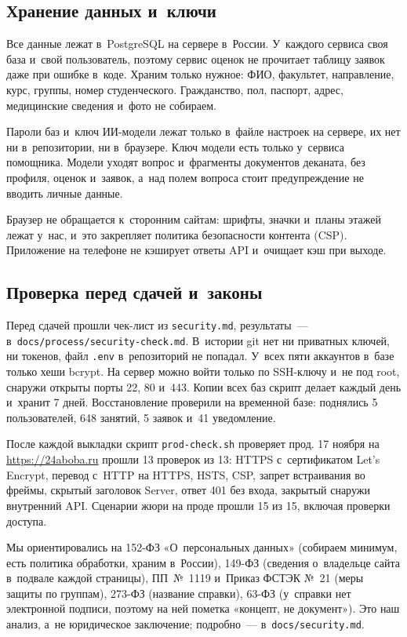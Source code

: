 \documentclass[a4paper,10pt]{article}
\let\oldsubsection\subsection
\renewcommand{\subsection}{\Needspace{10\baselineskip}\oldsubsection}
\newcommand{\code}[1]{\texttt{#1}}
\begin{document}
\subsection{Хранение данных и~ключи}

Все данные лежат в~PostgreSQL на сервере в~России. У~каждого сервиса своя база и~свой пользователь, поэтому сервис оценок не прочитает таблицу заявок даже при ошибке в~коде. Храним только нужное: ФИО, факультет, направление, курс, группы, номер студенческого. Гражданство, пол, паспорт, адрес, медицинские сведения и~фото не собираем.

Пароли баз и~ключ ИИ-модели лежат только в~файле настроек на сервере, их нет ни в~репозитории, ни в~браузере. Ключ модели есть только у~сервиса помощника. Модели уходят вопрос и~фрагменты документов деканата, без профиля, оценок и~заявок, а~над полем вопроса стоит предупреждение не вводить личные данные.

Браузер не обращается к~сторонним сайтам: шрифты, значки и~планы этажей лежат у~нас, и~это закрепляет политика безопасности контента (CSP). Приложение на телефоне не кэширует ответы API и~очищает кэш при выходе.

\subsection{Проверка перед сдачей и~законы}

Перед сдачей прошли чек-лист из \code{security.md}, результаты~— в~\code{docs/\allowbreak{}process/\allowbreak{}security-check.md}. В~истории git нет ни приватных ключей, ни токенов, файл \code{.env} в~репозиторий не попадал. У~всех пяти аккаунтов в~базе только хеши bcrypt. На сервер можно войти только по SSH-ключу и~не под root, снаружи открыты порты 22, 80 и~443. Копии всех баз скрипт делает каждый день и~хранит 7 дней. Восстановление проверили на временной базе: поднялись 5 пользователей, 648 занятий, 5 заявок и~41 уведомление.

После каждой выкладки скрипт \code{prod-check.sh} проверяет прод. 17 ноября на \href{https://24aboba.ru}{https://24aboba.ru} прошли 13 проверок из 13: HTTPS с~сертификатом Let's Encrypt, перевод с~HTTP на HTTPS, HSTS, CSP, запрет встраивания во фреймы, скрытый заголовок Server, ответ 401 без входа, закрытый снаружи внутренний API. Сценарии жюри на проде прошли 15 из 15, включая проверки доступа.

Мы ориентировались на 152-ФЗ «О~персональных данных» (собираем минимум, есть политика обработки, храним в~России), 149-ФЗ (сведения о~владельце сайта в~подвале каждой страницы), ПП~№~1119 и~Приказ ФСТЭК №~21 (меры защиты по группам), 273-ФЗ (название справки), 63-ФЗ (у~справки нет электронной подписи, поэтому на ней пометка «концепт, не документ»). Это наш анализ, а~не юридическое заключение; подробно~— в~\code{docs/\allowbreak{}security.md}.
\end{document}
